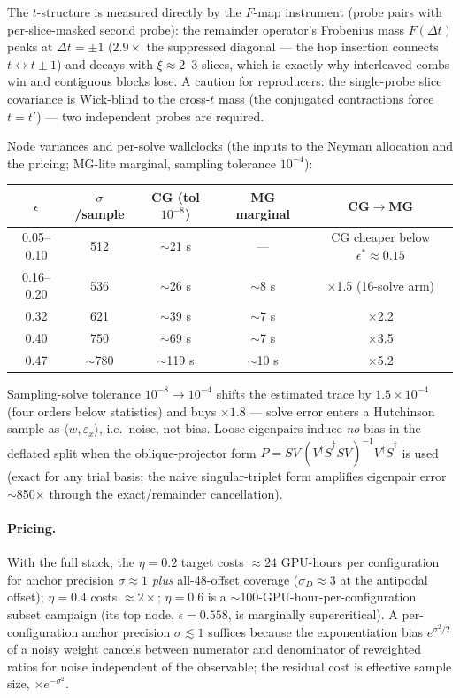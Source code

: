 \documentclass[11pt]{article}
\begin{document}
The $t$-structure is measured directly by the $F$-map instrument
(probe pairs with per-slice-masked second probe): the remainder
operator's Frobenius mass $F(\Delta t)$ peaks at $\Delta t = \pm1$
($2.9\times$ the suppressed diagonal --- the hop insertion connects
$t \leftrightarrow t\pm1$) and decays with $\xi \approx 2$--3 slices,
which is exactly why interleaved combs win and contiguous blocks lose.
A caution for reproducers: the single-probe slice covariance is
Wick-blind to the cross-$t$ mass (the conjugated contractions force
$t = t'$) --- two independent probes are required.

Node variances and per-solve wallclocks (the inputs to the Neyman
allocation and the pricing; MG-lite marginal, sampling tolerance
$10^{-4}$):

\begin{center}
\begin{tabular}{ccccc}
\toprule
$\epsilon$ & $\sigma$/sample & CG (tol $10^{-8}$) & MG marginal & CG$\to$MG \\
\midrule
0.05--0.10 & 512 & $\sim$21 s & --- & CG cheaper below $\epsilon^*\!\approx\!0.15$ \\
0.16--0.20 & 536 & $\sim$26 s & $\sim$8 s & $\times$1.5 (16-solve arm) \\
0.32 & 621 & $\sim$39 s & $\sim$7 s & $\times$2.2 \\
0.40 & 750 & $\sim$69 s & $\sim$7 s & $\times$3.5 \\
0.47 & $\sim$780 & $\sim$119 s & $\sim$10 s & $\times$5.2 \\
\bottomrule
\end{tabular}
\end{center}

Sampling-solve tolerance $10^{-8}\to10^{-4}$ shifts the estimated trace
by $1.5\times10^{-4}$ (four orders below statistics) and buys
$\times1.8$ --- solve error enters a Hutchinson sample as
$\langle w, \varepsilon_x\rangle$, i.e.\ noise, not bias.  Loose
eigenpairs induce \emph{no} bias in the deflated split when the
oblique-projector form
$P = \tilde S V\,(V^\dagger \tilde S^\dagger \tilde S V)^{-1}
V^\dagger \tilde S^\dagger$ is used (exact for any trial basis; the
naive singular-triplet form amplifies eigenpair error $\sim$850$\times$
through the exact/remainder cancellation).

\paragraph{Pricing.}  With the full stack, the $\eta=0.2$ target costs
$\approx 24$ GPU-hours per configuration for anchor precision
$\sigma \approx 1$ \emph{plus} all-48-offset coverage
($\sigma_D \approx 3$ at the antipodal offset); $\eta = 0.4$ costs
$\approx 2\times$; $\eta = 0.6$ is a $\sim$100-GPU-hour-per-configuration
subset campaign (its top node, $\epsilon = 0.558$, is marginally
supercritical).  A per-configuration anchor precision $\sigma \lesssim 1$
suffices because the exponentiation bias $e^{\sigma^2/2}$ of a noisy
weight cancels between numerator and denominator of reweighted ratios
for noise independent of the observable; the residual cost is effective
sample size, $\times e^{-\sigma^2}$.
\end{document}
